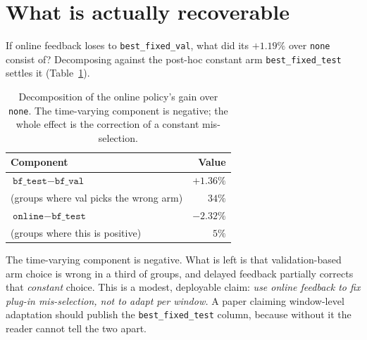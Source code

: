 \documentclass[a4paper,fleqn]{cas-sc}
\newcommand{\arm}[1]{\texttt{#1}}
\begin{document}
\section{What is actually recoverable}
\label{sec:recover}

If online feedback loses to \arm{best\_fixed\_val}, what did its $+1.19\%$ over
\arm{none} consist of? Decomposing against the post-hoc constant arm
\arm{best\_fixed\_test} settles it (Table~\ref{tab:decomp}).

\begin{table}[t]
\centering\small
\caption{Decomposition of the online policy's gain over \arm{none}. The
time-varying component is negative; the whole effect is the correction of a
constant mis-selection.}
\label{tab:decomp}
\begin{tabular}{lr}
\toprule
Component & Value \\
\midrule
$\arm{bf\_test} - \arm{bf\_val}$ & $+1.36\%$ \\
\quad (groups where val picks the wrong arm) & $34\%$ \\
$\arm{online} - \arm{bf\_test}$ & $-2.32\%$ \\
\quad (groups where this is positive) & $5\%$ \\
\bottomrule
\end{tabular}
\end{table}

The time-varying component is negative. What is left is that
validation-based arm choice is wrong in a third of groups, and delayed feedback
partially corrects that \emph{constant} choice. This is a modest,
deployable claim: \emph{use online feedback to fix plug-in mis-selection, not to
adapt per window.} A paper claiming window-level adaptation should publish the
\arm{best\_fixed\_test} column, because without it the reader cannot tell the two
apart.
\end{document}
